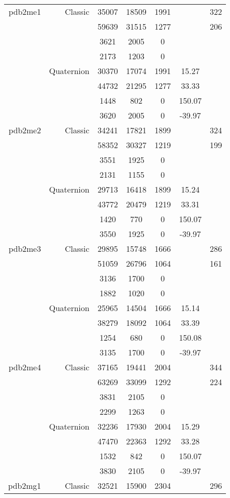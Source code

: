 \begin{xltabular}{\textwidth}{r|rcccSc}
pdb2me1 & Classic & 35007 & 18509 & 1991 & & 322 \\
& & 59639 & 31515 & 1277 & & 206 \\
& & 3621 & 2005 & 0 & & \\
& & 2173 & 1203 & 0 & & \\
& Quaternion & 30370 & 17074 & 1991 & 15.27 & \\
& & 44732 & 21295 & 1277 & 33.33 & \\
& & 1448 & 802 & 0 & 150.07 & \\
& & 3620 & 2005 & 0 & -39.97 & \\ \addlinespace
pdb2me2 & Classic & 34241 & 17821 & 1899 & & 324 \\
& & 58352 & 30327 & 1219 & & 199 \\
& & 3551 & 1925 & 0 & & \\
& & 2131 & 1155 & 0 & & \\
& Quaternion & 29713 & 16418 & 1899 & 15.24 & \\
& & 43772 & 20479 & 1219 & 33.31 & \\
& & 1420 & 770 & 0 & 150.07 & \\
& & 3550 & 1925 & 0 & -39.97 & \\ \addlinespace
pdb2me3 & Classic & 29895 & 15748 & 1666 & & 286 \\
& & 51059 & 26796 & 1064 & & 161 \\
& & 3136 & 1700 & 0 & & \\
& & 1882 & 1020 & 0 & & \\
& Quaternion & 25965 & 14504 & 1666 & 15.14 & \\
& & 38279 & 18092 & 1064 & 33.39 & \\
& & 1254 & 680 & 0 & 150.08 & \\
& & 3135 & 1700 & 0 & -39.97 & \\ \addlinespace
pdb2me4 & Classic & 37165 & 19441 & 2004 & & 344 \\
& & 63269 & 33099 & 1292 & & 224 \\
& & 3831 & 2105 & 0 & & \\
& & 2299 & 1263 & 0 & & \\
& Quaternion & 32236 & 17930 & 2004 & 15.29 & \\
& & 47470 & 22363 & 1292 & 33.28 & \\
& & 1532 & 842 & 0 & 150.07 & \\
& & 3830 & 2105 & 0 & -39.97 & \\ \addlinespace
pdb2mg1 & Classic & 32521 & 15900 & 2304 & & 296 \\

\end{xltabular}
